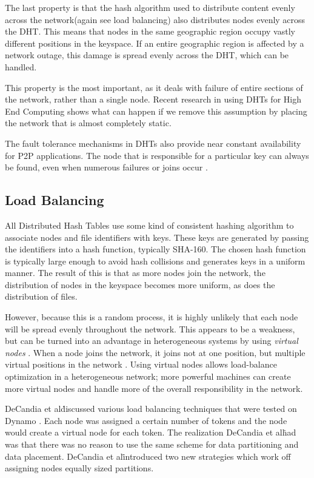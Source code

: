 \documentclass[10pt,letterpaper,twoside]{report}
\begin{document}
The last property is that the hash algorithm used to distribute content evenly across the network(again see load balancing) also distributes nodes evenly across the DHT.  
This means that nodes in the same geographic region occupy vastly different positions in the keyspace.  
If an entire geographic region is affected by a network outage, this damage is spread evenly across the DHT, which can be handled.

This property is the most important, as it deals with failure of entire sections of the network, rather than a single node.
Recent research in using DHTs for High End Computing \cite{li2013zht} shows what can happen if we remove this assumption by placing the network that is almost completely static.

The fault tolerance mechanisms in DHTs also provide near constant availability for P2P applications.
The node that is responsible for a particular key can always be found, even when numerous failures or joins occur \cite{chord}.

\subsection{Load Balancing}
\label{subsec:lb}
All Distributed Hash Tables use some kind of consistent hashing algorithm to associate nodes and file identifiers with keys.  
These keys are generated by passing the identifiers into a hash function, typically SHA-160.
The chosen hash function is typically large enough to avoid hash collisions and generates keys in a uniform manner. 
The result of this is that as more nodes join the network, the distribution of nodes in the keyspace becomes more uniform, as does the distribution of files.

However, because this is a random process, it is highly unlikely that each node will be spread evenly throughout the network.
This appears to be a weakness, but can be turned into an advantage in heterogeneous systems by using \textit{virtual nodes} \cite{godfrey2005heterogeneity} \cite{dynamo}.
When a node joins the network, it joins not at one position, but multiple virtual positions in the network \cite{dynamo}.
Using virtual nodes allows load-balance optimization in a heterogeneous network; more powerful machines can create more virtual nodes and handle more of the overall responsibility in the network.

DeCandia et al\. discussed various load balancing techniques that were tested on Dynamo \cite{dynamo}.  
Each node was assigned a certain number of tokens and the node would create a virtual node for each token.
The realization DeCandia et al\. had was that there was no reason to use the same scheme for data partitioning and data placement.
DeCandia et al\. introduced two new strategies which work off assigning nodes equally sized partitions.
\end{document}
